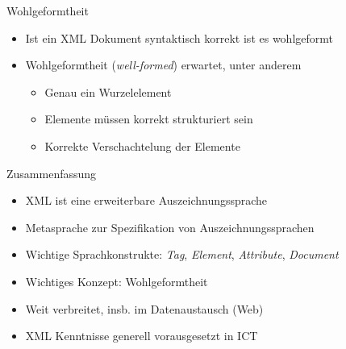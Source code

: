 \documentclass{beamer}
\begin{document}
\begin{frame}{Wohlgeformtheit}
	
	\begin{itemize}
		\item Ist ein XML Dokument syntaktisch korrekt ist es wohlgeformt
		\item Wohlgeformtheit (\emph{well-formed}) erwartet, unter anderem
		\begin{itemize}
			\item Genau ein Wurzelelement
			\item Elemente müssen korrekt strukturiert sein
			\item Korrekte Verschachtelung der Elemente
		\end{itemize} 
	\end{itemize}
	
\end{frame}

\begin{frame}{Zusammenfassung}
	
	\begin{itemize}
		\item XML ist eine erweiterbare Auszeichnungssprache
		\item Metasprache zur Spezifikation von Auszeichnungssprachen
		\item Wichtige Sprachkonstrukte: \emph{Tag}, \emph{Element}, \emph{Attribute}, \emph{Document}
		\item Wichtiges Konzept: Wohlgeformtheit
		\item Weit verbreitet, insb. im Datenaustausch (Web)
		\item XML Kenntnisse generell vorausgesetzt in ICT
	\end{itemize}
	
\end{frame}
\end{document}
